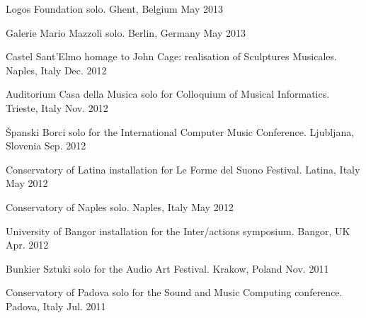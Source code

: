 \begin{cvhonors}
  \cvhonor
    {Logos Foundation}
    {solo.}
    {Ghent, Belgium}
    {May 2013} %

  \cvhonor
    {Galerie Mario Mazzoli}
    {solo.}
    {Berlin, Germany}
    {May 2013} %

  \cvhonor
    {Castel Sant'Elmo}
    {homage to John Cage: realisation of Sculptures Musicales.}
    {Naples, Italy}
    {Dec. 2012} %

  \cvhonor
    {Auditorium Casa della Musica}
    {solo for Colloquium of Musical Informatics.}
    {Trieste, Italy}
    {Nov. 2012} %

  \cvhonor
    {\v{S}panski Borci}
    {solo for the International Computer Music Conference.}
    {Ljubljana, Slovenia}
    {Sep. 2012} %

  \cvhonor
    {Conservatory of Latina}
    {installation for Le Forme del Suono Festival.}
    {Latina, Italy}
    {May 2012} %

  \cvhonor
    {Conservatory of Naples}
    {solo.}
    {Naples, Italy}
    {May 2012} %

  \cvhonor
    {University of Bangor}
    {installation for the Inter/actions symposium.}
    {Bangor, UK}
    {Apr. 2012} %

  \cvhonor
    {Bunkier Sztuki}
    {solo for the Audio Art Festival.}
    {Krakow, Poland}
    {Nov. 2011} %

  \cvhonor
    {Conservatory of Padova}
    {solo for the Sound and Music Computing conference.}
    {Padova, Italy}
    {Jul. 2011} %

\end{cvhonors}
